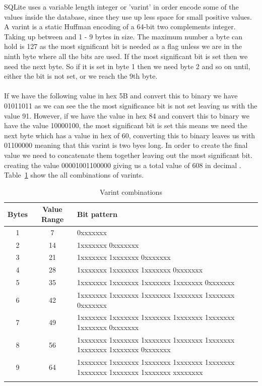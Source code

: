 SQLite uses a variable length integer or 'varint' in order encode some of the values inside the database, since they use up less space for small positive values. A varint is a static Huffman encoding of a 64-bit two complements integer. Taking up between and 1 - 9 bytes in size. The maximum number a byte can hold is 127 as the most significant bit is needed as a flag unless we are in the ninth byte where all the bits are used. If the most significant bit is set then we need the next byte. So if it is set in byte 1 then we need byte 2 and so on until, either the bit is not set, or we reach the 9th byte.
\\\\
If we have the following value in hex 5B and convert this to binary we have 01011011 as we can see the the most significance bit is not set leaving us with the value 91. However, if we have the value in hex 84 and convert this to binary we have the value 10000100, the most significant bit is set this means we need the next byte which has a value in hex of 60, converting this to binary leaves us with  01100000 meaning that this varint is two byes long. In order to create the final value we need to concatenate them together leaving out the most significant bit. creating the value 00001001100000 giving us a total value of 608 in decimal \citep{sausagefactory}. Table~\ref{tbl:varints} show the all combinations of varints. 

\begin{longtable}[h]{| c | c | p{10cm} |}
		\hline
			\textbf{Bytes} & \textbf{Value Range} & \textbf{Bit pattern} \\ 
		\hline
		\endhead
			1 & 7 &  0xxxxxxx \\ \hline
			2 & 14 & 1xxxxxxx 0xxxxxxx\\ \hline
			3 & 21 & 1xxxxxxx 1xxxxxxx 0xxxxxxx\\ \hline
			4 & 28 & 1xxxxxxx 1xxxxxxx 1xxxxxxx 0xxxxxxx\\ \hline
			5 & 35 & 1xxxxxxx 1xxxxxxx 1xxxxxxx 1xxxxxxx 0xxxxxxx\\ \hline
			6 & 42 & 1xxxxxxx 1xxxxxxx 1xxxxxxx 1xxxxxxx 1xxxxxxx 0xxxxxxx\\ \hline
			7 & 49 & 1xxxxxxx 1xxxxxxx 1xxxxxxx 1xxxxxxx 1xxxxxxx 1xxxxxxx 0xxxxxxx\\ \hline
			8 & 56 & 1xxxxxxx 1xxxxxxx 1xxxxxxx 1xxxxxxx 1xxxxxxx 1xxxxxxx 1xxxxxxx 0xxxxxxx\\ \hline
			9 & 64 & 1xxxxxxx 1xxxxxxx 1xxxxxxx 1xxxxxxx 1xxxxxxx 1xxxxxxx 1xxxxxxx 1xxxxxxx xxxxxxxx\\
		\hline
	\caption{Varint combinations \cite{sqliteray}}
	\label{tbl:varints}
\end{longtable}

